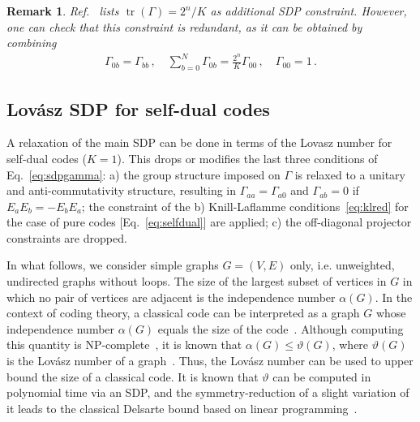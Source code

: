 \documentclass[12pt,a4paper]{amsart}
\DeclareMathOperator{\tr}{tr}
\newtheorem{remark}[theorem]{Remark}
\begin{document}
\begin{remark}\label{rmk:tr} Ref.~\cite{munne2025sdpboundsquantumcodes} lists 
$\tr(\Gamma)=2^n/K$ as additional SDP constraint. 
However, one can check that this constraint is redundant, as it can be obtained by combining
%
\begin{align}
\Gamma_{0b}=\Gamma_{bb}\,, \quad \sum^N_{b=0}\Gamma_{0b}=\frac{2^n}{K}\Gamma_{00}\,, \quad \Gamma_{00}=1\,.
\end{align}
\end{remark}

\subsection{Lovász SDP for self-dual codes}\label{sec:lov}
A relaxation of the main SDP
can be done in terms of the Lovasz number
for self-dual codes ($K=1$). 
This drops or modifies the last three conditions of Eq.~\eqref{eq:sdpgamma}:
a) the group structure imposed on $\Gamma$ is relaxed to a unitary and anti-commutativity structure, resulting in $\Gamma_{aa} = \Gamma_{a0}$ and $\Gamma_{ab} = 0$ if $E_a E_b = -E_b E_a$;
the constraint of the 
b) Knill-Laflamme conditions~\eqref{eq:klred} 
for the case of pure codes [Eq.~\eqref{eq:selfdual}]
are
applied;
c) the off-diagonal projector constraints are dropped.


In what follows, we consider simple graphs $G = (V,E)$ only, i.e. unweighted, undirected graphs without loops.
%
The size of the largest subset of vertices in $G$ in which no pair of vertices are adjacent is the independence number $\alpha(G)$.
%
In the context of coding theory, a classical code can be interpreted as a graph $G$ whose independence number $\alpha(G)$ equals the size of the code~\cite{1055985}.
% 
Although computing this quantity is NP-complete~\cite{DBLP:books/fm/GareyJ79}, 
it is known that $\alpha(G) \leq \vartheta(G)$, where $\vartheta(G)$ is the Lovász number of a graph~\cite{1055985}.
% 
Thus, the Lovász number can be used to upper bound the size of a classical code. 
It is known that $\vartheta$ can be computed in polynomial time via an SDP, 
and the symmetry-reduction of a slight variation of it 
leads to the classical Delsarte bound based on linear programming~\cite{1056072}.
\end{document}
